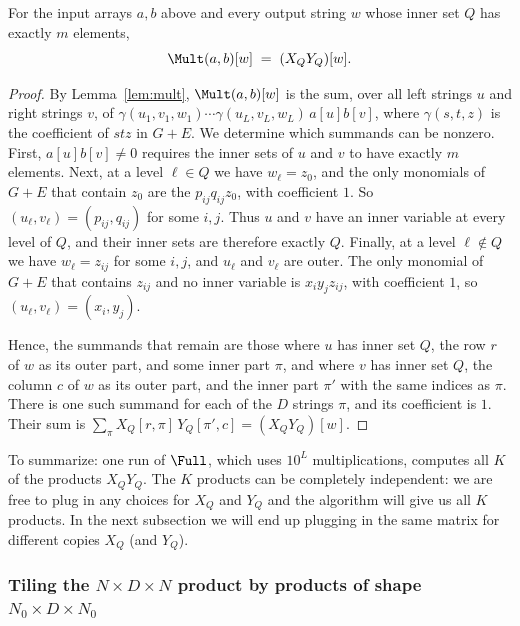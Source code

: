 \begin{lemma}\label{lem:correct}
For the input arrays $a,b$ above and every output string $w$ whose inner set $Q$ has exactly $m$ elements,
\begin{equation}\label{eq:sum}
\Mult(a,b)[w]\;=\;(X_QY_Q)[w] .
\end{equation}
\end{lemma}

\begin{proof}
By Lemma~\ref{lem:mult}, $\Mult(a,b)[w]$ is the sum, over all left strings $u$ and right strings $v$, of $\gamma(u_1,v_1,w_1)\cdots\gamma(u_L,v_L,w_L)\,a[u]b[v]$, where $\gamma(s,t,z)$ is the coefficient of $stz$ in $G+E$. We determine which summands can be nonzero. First, $a[u]b[v]\ne0$ requires the inner sets of $u$ and $v$ to have exactly $m$ elements. Next, at a level $\ell\in Q$ we have $w_\ell=z_0$, and the only monomials of $G+E$ that contain $z_0$ are the $p_{ij}q_{ij}z_0$, with coefficient $1$. So $(u_\ell,v_\ell)=(p_{ij},q_{ij})$ for some $i,j$. Thus $u$ and $v$ have an inner variable at every level of $Q$, and their inner sets are therefore exactly $Q$. Finally, at a level $\ell\notin Q$ we have $w_\ell=z_{ij}$ for some $i,j$, and $u_\ell$ and $v_\ell$ are outer. The only monomial of $G+E$ that contains $z_{ij}$ and no inner variable is $x_iy_jz_{ij}$, with coefficient $1$, so $(u_\ell,v_\ell)=(x_i,y_j)$.

Hence, the summands that remain are those where $u$ has inner set $Q$, the row $r$ of $w$ as its outer part, and some inner part $\pi$, and where $v$ has inner set $Q$, the column $c$ of $w$ as its outer part, and the inner part $\pi'$ with the same indices as $\pi$. There is one such summand for each of the $D$ strings $\pi$, and its coefficient is $1$. Their sum is $\sum_\pi X_Q[r,\pi]\,Y_Q[\pi',c]=(X_QY_Q)[w]$.
\end{proof}

To summarize: one run of $\Full$, which uses $10^L$ multiplications, computes all $K$ of the products $X_QY_Q$. The $K$ products can be completely independent: we are free to plug in any choices for $X_Q$ and $Y_Q$ and the algorithm will give us all $K$ products. In the next subsection we will end up plugging in the same matrix for different copies $X_Q$ (and $Y_Q$). 



\subsubsection{\texorpdfstring{Tiling the $N\times D\times N$ product by products of shape $N_0\times D\times N_0$}{Tiling the N x D x N product by products of shape N0 x D x N0}}\label{sec:tiling}

